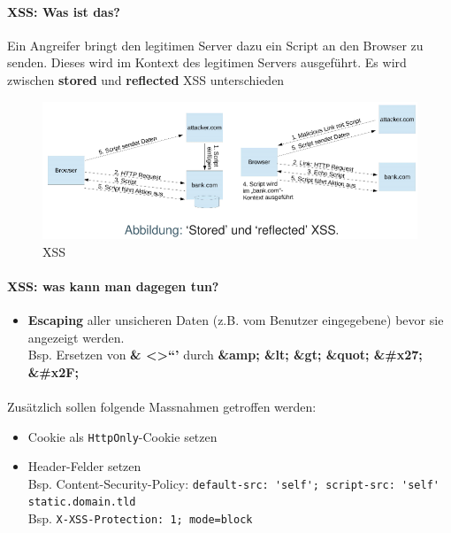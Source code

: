 \documentclass[10pt,a4paper]{article}
\begin{document}
\paragraph*{XSS: Was ist das?}Ein Angreifer bringt den legitimen Server dazu ein Script an den Browser zu senden. Dieses wird im Kontext des legitimen Servers ausgeführt. Es wird zwischen \textbf{stored} und \textbf{reflected} XSS unterschieden
\begin{figure}[H]
    \begin{center}
    \includegraphics[width=15cm]{images/XSS.png}
    \caption{XSS}
    \label{XSS}
    \end{center}
\end{figure}

\paragraph*{XSS: was kann man dagegen tun?}
\begin{itemize}[noitemsep,topsep=0pt,leftmargin=*]
    \item \textbf {Escaping} aller unsicheren Daten (z.B. vom Benutzer eingegebene) bevor sie angezeigt werden.\\ Bsp. Ersetzen von \textbf{\& \textless \textgreater \textquotedblleft \textquoteright} durch \textbf{\&amp; \&lt; \&gt; \&quot; \&\#x27; \&\#x2F;}
\end{itemize}
\paragraph*{}Zusätzlich sollen folgende Massnahmen getroffen werden:
\begin{itemize}[noitemsep,topsep=0pt,leftmargin=*]
    \item Cookie als \texttt{HttpOnly}-Cookie setzen
    \item Header-Felder setzen\\ Bsp. Content-Security-Policy: \verb|default-src: 'self'; script-src: 'self' static.domain.tld| \\ Bsp. \verb|X-XSS-Protection: 1; mode=block|
\end{itemize}
\end{document}
